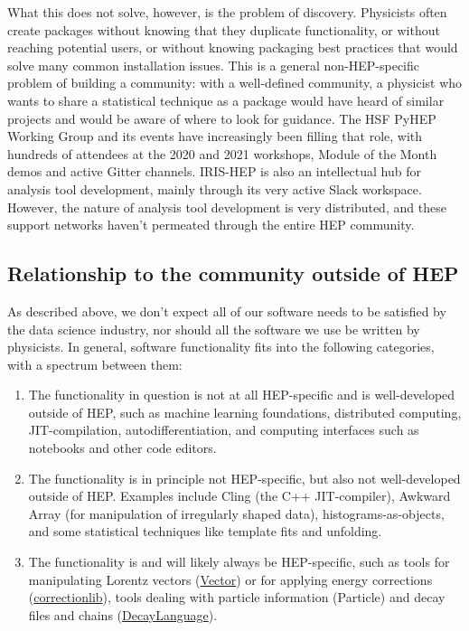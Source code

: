 \documentclass[12pt,a4paper]{article}
\begin{document}
What this does not solve, however, is the problem of discovery. Physicists often create packages without knowing that they duplicate functionality, or without reaching potential users, or without knowing packaging best practices that would solve many common installation issues. This is a general non-HEP-specific problem of building a community: with a well-defined community, a physicist who wants to share a statistical technique as a package would have heard of similar projects and would be aware of where to look for guidance. The HSF PyHEP Working Group and its events have increasingly been filling that role, with hundreds of attendees at the 2020 and 2021 workshops, Module of the Month demos and active Gitter channels. IRIS-HEP is also an intellectual hub for analysis tool development, mainly through its very active Slack workspace. However, the nature of analysis tool development is very distributed, and these support networks haven't permeated through the entire HEP community.

\subsection{Relationship to the community outside of HEP}

As described above, we don't expect all of our software needs to be satisfied by the data science industry, nor should all the software we use be written by physicists. In general, software functionality fits into the following categories, with a spectrum between them:

\begin{enumerate}
\item The functionality in question is not at all HEP-specific and is well-developed outside of HEP, such as machine learning foundations, distributed computing, JIT-compilation, autodifferentiation, and computing interfaces such as notebooks and other code editors.

\item The functionality is in principle not HEP-specific, but also not well-developed outside of HEP. Examples include Cling (the C++ JIT-compiler), Awkward Array (for manipulation of irregularly shaped data), histograms-as-objects, and some statistical techniques like template fits and unfolding.

\item The functionality is and will likely always be HEP-specific, such as tools for manipulating Lorentz vectors (\href{https://github.com/scikit-hep/vector}{Vector}) or for applying energy corrections (\href{https://github.com/cms-nanoAOD/correctionlib}{correctionlib}), tools dealing with particle information (Particle) and decay files and chains (\href{https://github.com/scikit-hep/decaylanguage}{DecayLanguage}).
\end{enumerate}
\end{document}
